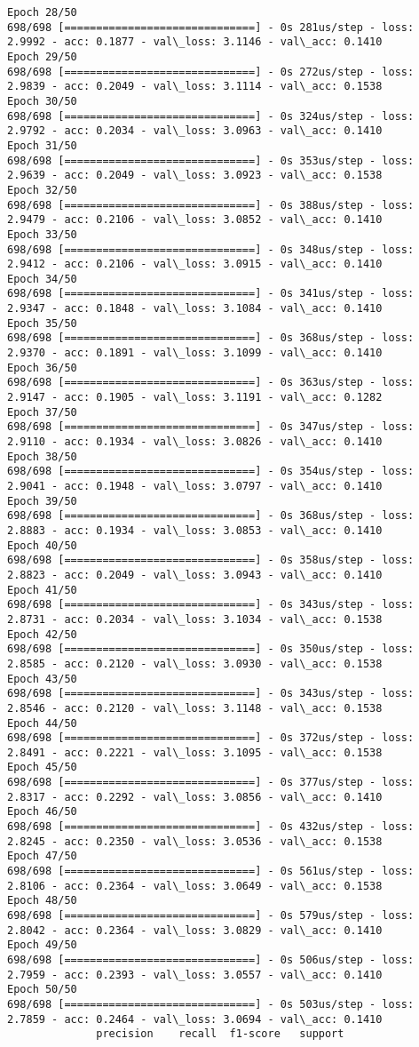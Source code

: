 \documentclass[11pt]{article}
\begin{document}
\begin{Verbatim}[commandchars=\\\{\}]
Epoch 28/50
698/698 [==============================] - 0s 281us/step - loss: 2.9992 - acc: 0.1877 - val\_loss: 3.1146 - val\_acc: 0.1410
Epoch 29/50
698/698 [==============================] - 0s 272us/step - loss: 2.9839 - acc: 0.2049 - val\_loss: 3.1114 - val\_acc: 0.1538
Epoch 30/50
698/698 [==============================] - 0s 324us/step - loss: 2.9792 - acc: 0.2034 - val\_loss: 3.0963 - val\_acc: 0.1410
Epoch 31/50
698/698 [==============================] - 0s 353us/step - loss: 2.9639 - acc: 0.2049 - val\_loss: 3.0923 - val\_acc: 0.1538
Epoch 32/50
698/698 [==============================] - 0s 388us/step - loss: 2.9479 - acc: 0.2106 - val\_loss: 3.0852 - val\_acc: 0.1410
Epoch 33/50
698/698 [==============================] - 0s 348us/step - loss: 2.9412 - acc: 0.2106 - val\_loss: 3.0915 - val\_acc: 0.1410
Epoch 34/50
698/698 [==============================] - 0s 341us/step - loss: 2.9347 - acc: 0.1848 - val\_loss: 3.1084 - val\_acc: 0.1410
Epoch 35/50
698/698 [==============================] - 0s 368us/step - loss: 2.9370 - acc: 0.1891 - val\_loss: 3.1099 - val\_acc: 0.1410
Epoch 36/50
698/698 [==============================] - 0s 363us/step - loss: 2.9147 - acc: 0.1905 - val\_loss: 3.1191 - val\_acc: 0.1282
Epoch 37/50
698/698 [==============================] - 0s 347us/step - loss: 2.9110 - acc: 0.1934 - val\_loss: 3.0826 - val\_acc: 0.1410
Epoch 38/50
698/698 [==============================] - 0s 354us/step - loss: 2.9041 - acc: 0.1948 - val\_loss: 3.0797 - val\_acc: 0.1410
Epoch 39/50
698/698 [==============================] - 0s 368us/step - loss: 2.8883 - acc: 0.1934 - val\_loss: 3.0853 - val\_acc: 0.1410
Epoch 40/50
698/698 [==============================] - 0s 358us/step - loss: 2.8823 - acc: 0.2049 - val\_loss: 3.0943 - val\_acc: 0.1410
Epoch 41/50
698/698 [==============================] - 0s 343us/step - loss: 2.8731 - acc: 0.2034 - val\_loss: 3.1034 - val\_acc: 0.1538
Epoch 42/50
698/698 [==============================] - 0s 350us/step - loss: 2.8585 - acc: 0.2120 - val\_loss: 3.0930 - val\_acc: 0.1538
Epoch 43/50
698/698 [==============================] - 0s 343us/step - loss: 2.8546 - acc: 0.2120 - val\_loss: 3.1148 - val\_acc: 0.1538
Epoch 44/50
698/698 [==============================] - 0s 372us/step - loss: 2.8491 - acc: 0.2221 - val\_loss: 3.1095 - val\_acc: 0.1538
Epoch 45/50
698/698 [==============================] - 0s 377us/step - loss: 2.8317 - acc: 0.2292 - val\_loss: 3.0856 - val\_acc: 0.1410
Epoch 46/50
698/698 [==============================] - 0s 432us/step - loss: 2.8245 - acc: 0.2350 - val\_loss: 3.0536 - val\_acc: 0.1538
Epoch 47/50
698/698 [==============================] - 0s 561us/step - loss: 2.8106 - acc: 0.2364 - val\_loss: 3.0649 - val\_acc: 0.1538
Epoch 48/50
698/698 [==============================] - 0s 579us/step - loss: 2.8042 - acc: 0.2364 - val\_loss: 3.0829 - val\_acc: 0.1410
Epoch 49/50
698/698 [==============================] - 0s 506us/step - loss: 2.7959 - acc: 0.2393 - val\_loss: 3.0557 - val\_acc: 0.1410
Epoch 50/50
698/698 [==============================] - 0s 503us/step - loss: 2.7859 - acc: 0.2464 - val\_loss: 3.0694 - val\_acc: 0.1410
              precision    recall  f1-score   support


\end{Verbatim}
\end{document}
